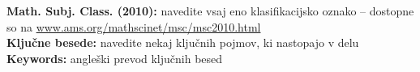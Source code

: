 \documentclass[12pt,a4paper]{amsart}
\theoremstyle{definition} %
\theoremstyle{plain} %
\begin{document}
\vfill\noindent
{\bf Math. Subj. Class. (2010):} navedite vsaj eno klasifikacijsko oznako -- dostopne so na \url{www.ams.org/mathscinet/msc/msc2010.html}  \\[1mm]  
{\bf Ključne besede:} navedite nekaj ključnih pojmov, ki nastopajo v delu  \\[1mm]  
{\bf Keywords:} angleški prevod ključnih besed
\pagebreak







\end{document}
